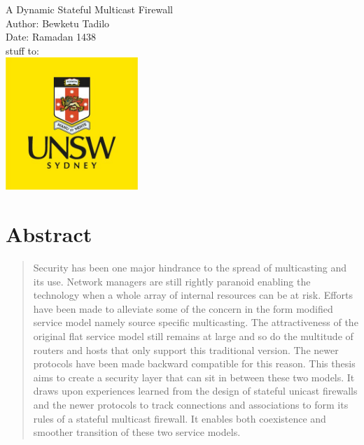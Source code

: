 \documentclass[11pt,left=2cm,bottom=2cm,oneside]{book}
\begin{document}
\pagenumbering{}
\begin{titlepage}
\nopagebreak
\centering
{\LARGE A Dynamic Stateful Multicast Firewall}\\
\vspace*{2cm}
{\Large Author: Bewketu Tadilo}\\
\vspace*{2cm}
{\Large Date: Ramadan 1438}\\
\vspace{2cm}
{\hspace{-3cm}\Large stuff to:}\\
\vspace{5.83cm}
\includegraphics[height=5cm]{unsw-logo.jpg}
\end{titlepage}

 \section*{\centering Abstract}
\begin{quotation}
Security has been one major hindrance to the spread of multicasting and its use. Network managers are still rightly paranoid
enabling the technology when a whole array of internal resources
can be at risk. Efforts have been made to alleviate some of the
concern in the form modified service model namely source specific
multicasting. The attractiveness of the original flat service model
still remains at large and so do the multitude of routers and hosts
that only support this traditional version. The newer protocols
have been made backward compatible for this reason. This thesis aims to create a security layer that can sit in between these
two models. It draws upon experiences learned from the design
of stateful unicast firewalls and the newer protocols to track connections and associations to form its rules of a stateful multicast
firewall. It enables both coexistence and smoother transition of
these two service models.
\end{quotation}
\clearpage
\vspace*{8cm}
\end{document}
